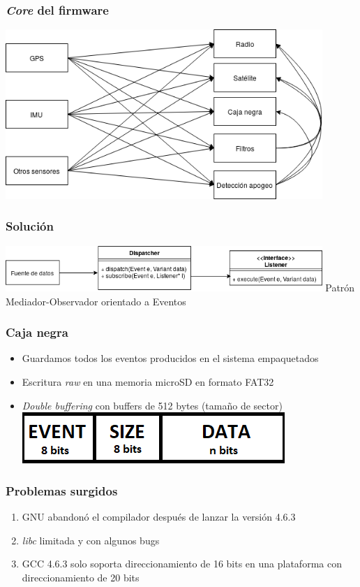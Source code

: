 \documentclass[numfooter]{beamer}
\begin{document}
    \begin{frame}
        \frametitle{\textit{Core} del firmware}
        \centering
        \includegraphics[width=0.9\textwidth]{images/problema.png}
    \end{frame}
    \begin{frame}
        \frametitle{Solución}
        \centering
        \includegraphics[width=0.9\textwidth]{images/solucion.png}
        \vfill
        Patrón Mediador-Observador orientado a Eventos
    \end{frame}
    \begin{frame}
        \frametitle{Caja negra}
        \begin{itemize}
            \item Guardamos todos los eventos producidos en el sistema empaquetados
            \item Escritura \textit{raw} en una memoria microSD en formato FAT32
            \item \textit{Double buffering} con buffers de 512 bytes (tamaño de sector)
            \vfill
            \centering
            \includegraphics{images/packet.png}
        \end{itemize}
    \end{frame}
    \begin{frame}
        \frametitle{Problemas surgidos}
        \begin{enumerate}
            \item GNU abandonó el compilador después de lanzar la versión 4.6.3
            \item \textit{libc} limitada y con algunos bugs
            \item GCC 4.6.3 solo soporta direccionamiento de 16 bits en una plataforma con direccionamiento de 20 bits
        \end{enumerate}
    \end{frame}
\end{document}
